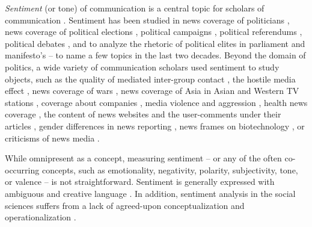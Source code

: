 \noindent \emph{Sentiment} (or tone) of communication is a central topic for scholars of communication \citep{lengauer2012negativity}. 
Sentiment has been studied in news coverage of politicians  \citep{hopmann2011incumbency,dunaway2015objectivity,vargo2014network}, news coverage of political elections \citep{kleinnijenhuis2019combined,kleinnijenhuis2007test,mccombes2000setting},
political campaigns \citep{cho2013campaign,shah2007campaign,haselmayer2019negative,Nai2019,Ridout2011}, political referendums \citep{elenbaas2008effects}, political debates \citep{nagel2012there,connaughton2004invitations,hopmann2011incumbency}, and to analyze the rhetoric of political elites in parliament and manifesto's \citep{Rhodes2019,Rheault2016,Kosmidis2018} -- to name a few topics in the last two decades. 
Beyond the domain of politics, a wide variety of communication scholars used sentiment to study objects, such as the quality of mediated inter-group contact \citep{wojcieszak2016saw}, the hostile media effect \citep{shin2017partisan}, news coverage of wars \citep{aday2010chasing}, news coverage of Asia in Asian and Western TV stations \citep{natarajan2003asian}, coverage about companies \citep{jonkman2020buffering}, media violence and aggression \citep{martins2013content}, health news coverage \citep{kim2015attracting}, the content of news websites \citep{valenzuela2017behavioral} and the user-comments under their articles \citep{muddiman2017news}, gender differences in news reporting  \citep{rodgers2003socialization}, news frames on biotechnology \citep{matthes2008content}, or criticisms of news media \citep{domke1999politics}.

While omnipresent as a concept, measuring sentiment -- or any of the often co-occurring concepts, such as emotionality, negativity, polarity, subjectivity, tone, or valence -- is not straightforward. 
Sentiment is generally expressed with ambiguous and creative language \citep{pang08,wiebe04,liu12}.
In addition, sentiment analysis in the social sciences suffers from a lack of agreed-upon conceptualization and operationalization \citep{lengauer2012negativity,kleinnijenhuis2008negativity}. 

